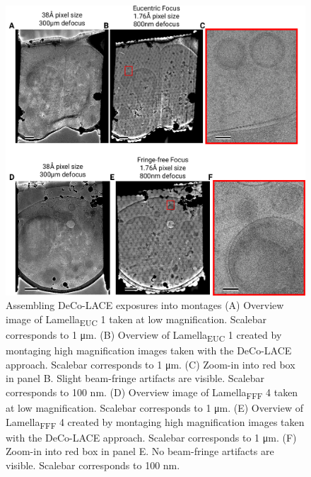 \documentclass[
]{article}
\begin{document}
\begin{figure}
\hypertarget{fig:assembly}{%
\centering
\includegraphics{figures/assembly.png}
\caption{Assembling DeCo-LACE exposures into montages (A) Overview
image of Lamella\textsubscript{EUC} 1 taken at low magnification. Scalebar corresponds to 1 μm. (B) Overview of Lamella\textsubscript{EUC} 1 created by
montaging high magnification images taken with the DeCo-LACE approach. Scalebar corresponds to 1 μm. (C) Zoom-in into red box in panel B. Slight beam-fringe artifacts are visible. Scalebar corresponds to 100 nm.
(D) Overview
image of Lamella\textsubscript{FFF} 4 taken at low magnification. Scalebar corresponds to 1 μm. (E) Overview of Lamella\textsubscript{FFF} 4 created by
montaging high magnification images taken with the DeCo-LACE approach. Scalebar corresponds to 1 μm. (F) Zoom-in into red box in panel E. No beam-fringe artifacts are visible. Scalebar corresponds to 100 nm.}\label{fig:assembly}
}
\end{figure}
\end{document}
